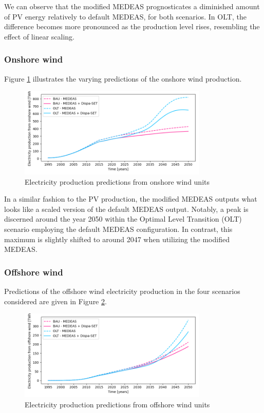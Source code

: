 We can observe that the modified MEDEAS prognosticates a diminished amount of PV energy relatively to default MEDEAS, for both scenarios. In OLT, the difference becomes more pronounced as the production level rises, resembling the effect of linear scaling.

\subsubsection{Onshore wind}

Figure \ref{fig:electricity-production-onshore} illustrates the varying predictions of the onshore wind production.

\begin{figure}[h]
    \centering
    \includegraphics[width=0.8\textwidth]{resources/images/electricity-production-onshore.png}
    \caption{Electricity production predictions from onshore wind units}
    \label{fig:electricity-production-onshore}
\end{figure}

In a similar fashion to the PV production, the modified MEDEAS outputs what looks like a scaled version of the default MEDEAS output. Notably, a peak is discerned around the year 2050 within the Optimal Level Transition (OLT) scenario employing the default MEDEAS configuration. In contrast, this maximum is slightly shifted to around 2047 when utilizing the modified MEDEAS. 

\subsubsection{Offshore wind}

Predictions of the offshore wind electricity production in the four scenarios considered are given in Figure \ref{fig:electricity-production-offshore}.

\begin{figure}[h]
    \centering
    \includegraphics[width=0.8\textwidth]{resources/images/electricity-production-offshore.png}
    \caption{Electricity production predictions from offshore wind units}
    \label{fig:electricity-production-offshore}
\end{figure}

